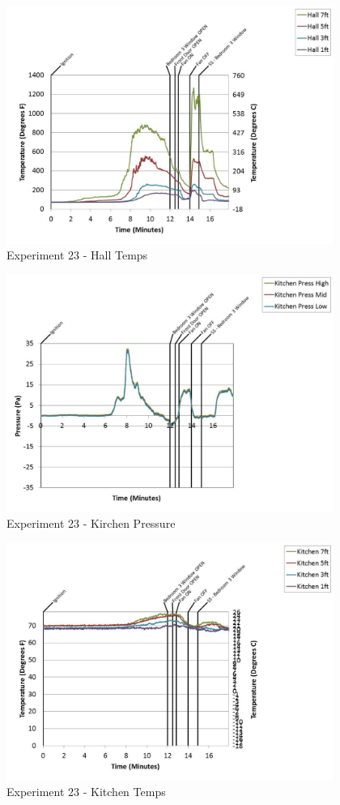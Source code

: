 \documentclass{article}
\begin{document}
\begin{appendices}
	\begin{figure}[h!]
		\centering
		\includegraphics[height=3.05in]{0_Images/Results_Charts/Exp_23_Charts/HallTemps.pdf}
		\caption{Experiment 23 - Hall Temps}
	\end{figure}
 
	\clearpage

	\begin{figure}[h!]
		\centering
		\includegraphics[height=3.05in]{0_Images/Results_Charts/Exp_23_Charts/KirchenPressure.pdf}
		\caption{Experiment 23 - Kirchen Pressure}
	\end{figure}
 

	\begin{figure}[h!]
		\centering
		\includegraphics[height=3.05in]{0_Images/Results_Charts/Exp_23_Charts/KitchenTemps.pdf}
		\caption{Experiment 23 - Kitchen Temps}
	\end{figure}
 

\end{appendices}
\end{document}
